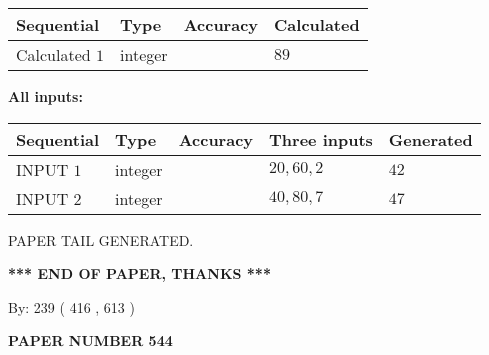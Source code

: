 \documentclass[12pt]{article}
\begin{document}
  
\noindent\begin{tabular}{|l|l|l|l|}
\hline
 Sequential & Type & Accuracy & Calculated \\ 
\hline
 
 
  Calculated $  1 $ & integer &  & 
  $ 89 $ 
 \\  \hline  
 \end{tabular}
   
   
   
   
\noindent\vspace{0.1in}\hspace{-0.08in} {\textbf{\Large{All inputs: }}}
   
   
  
  
\noindent\begin{tabular}{|l|l|l|l|l|}
\hline
 Sequential & Type & Accuracy & Three inputs & Generated \\ 
\hline
 
 
  INPUT $  1 $ & integer &  & $
 20
 , 
 60
 , 
 2
 $ & $ 42 $ 
 \\  \hline  
 
 
  INPUT $  2 $ & integer &  & $
 40
 , 
 80
 , 
 7
 $ & $ 47 $ 
 \\  \hline  
 \end{tabular}
   
   
   
   
   
   
 \vspace{0.2in}
 
   
   
\vspace{2.0in} PAPER TAIL GENERATED.
   
   
   
   
\vspace{1.0in} 
{\textbf{\large{ *** END OF PAPER, THANKS *** }}} 
   
   
\hspace{1.0in} By: 
 239 ( 416 ,  613 )
   
   
   
   
\newpage 
\setcounter{page}{ 
   544001 } 
   
   
   
   
 {\textbf{ \Large{ PAPER NUMBER  544  }}}
   
   
\vspace{0.2in}
   
   
   
\end{document}
